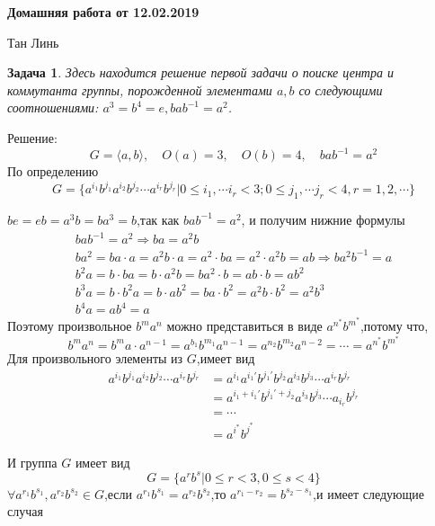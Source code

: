 \documentclass[12pt]{article} %
\theoremstyle{neosn} %
\newtheorem{problem}{Задача} %
\begin{document}
\begin{center}
	{\bf \Large Домашняя работа от 12.02.2019}
\end{center}

\begin{center}
	Тан Линь
\end{center}

\begin{problem}
Здесь находится решение первой задачи о поиске центра и коммутанта группы, порожденной элементами $a, b$ со следующими соотношениями: $a^3=b^4=e, bab^{-1}=a^2$.
\end{problem}

Решение:
$$
G = \langle a,b \rangle, \quad O(a) = 3,\quad O(b) = 4,\quad bab^{-1}=a^2
$$
По определению
$$
G=\{a^{i_1}b^{j_1}a^{i_2}b^{j_2}\cdots a^{i_r}b^{j_r}|0 \leqslant i_1,\cdots i_r < 3;0 \leqslant j_1, \cdots j_r < 4, r = 1,2,\cdots\}
$$

$be=eb=a^3b=ba^3=b$,так как $bab^{-1}=a^2$,
и получим нижние формулы
\begin{gather*}
	bab^{-1} = a^2 \Rightarrow ba=a^2b \\
	ba^2 = ba\cdot a = a^2b\cdot a = a^2\cdot ba = a^2\cdot a^2b = ab \Rightarrow ba^2b^{-1}=a \\
	b^2a=b\cdot ba =b\cdot a^2b=ba^2\cdot b=ab\cdot b=ab^2 \\
	b^3a=b\cdot b^2a=b\cdot ab^2=ba\cdot b^2=a^2b\cdot b^2=a^2b^3 \\
	b^4a=ab^4=a
\end{gather*}
Поэтому произвольное $b^ma^n$ можно представиться в виде $a^{n^{*}}b^{m^{*}}$,потому что,
$$
b^ma^n=b^ma\cdot a^{n-1}=a^{b_1}b^{m_1}a^{n-1}=a^{n_2}b^{m_2}a^{n-2}=\cdots =a^{n^*}b^{m^*}
$$
Для произвольного элементы из $G$,имеет вид
\begin{align*}
	a^{i_1}b^{j_1}a^{i_2}b^{j_2}\cdots a^{i_r}b^{j_r}   &= a^{i_1}a^{i_1'}b^{j_1'}b^{j_2}a^{i_3}b^{j_3}\cdots a^{i_r}b^{j_r} \\
									&= a^{i_1+i_1'}b^{j_1'+j_2}a^{i_3}b^{j_3}\cdots a_{i_r}b^{j_r} \\
									&= \cdots \\
									&=a^{i^*}b^{j^*}
\end{align*}

И группа $G$ имеет вид
$$
G = \{ a^rb^s|0\leqslant r<3,0\leqslant s < 4\}
$$
$\forall a^{r_1}b^{s_1},a^{r_2}b^{s_2} \in G $,если $a^{r_1}b^{s_1}=a^{r_2}b^{s_2}$,то $a^{r_1-r_2}=b^{s_2-s_1}$,и имеет следующие
случая
\end{document}
